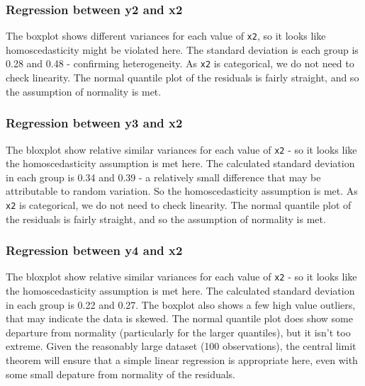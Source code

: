 \documentclass[
  letterpaper,
  DIV=11,
  numbers=noendperiod]{scrreprt}
\begin{document}
\subsubsection{Regression between y2 and
x2}\label{regression-between-y2-and-x2}

The boxplot shows different variances for each value of \texttt{x2}, so
it looks like homoscedasticity might be violated here. The standard
deviation is each group is 0.28 and 0.48 - confirming heterogeneity. As
\texttt{x2} is categorical, we do not need to check linearity. The
normal quantile plot of the residuals is fairly straight, and so the
assumption of normality is met.

\subsubsection{Regression between y3 and
x2}\label{regression-between-y3-and-x2}

The bloxplot show relative similar variances for each value of
\texttt{x2} - so it looks like the homoscedasticity assumption is met
here. The calculated standard deviation in each group is 0.34 and 0.39 -
a relatively small difference that may be attributable to random
variation. So the homoscedasticity assumption is met. As \texttt{x2} is
categorical, we do not need to check linearity. The normal quantile plot
of the residuals is fairly straight, and so the assumption of normality
is met.

\subsubsection{Regression between y4 and
x2}\label{regression-between-y4-and-x2}

The bloxplot show relative similar variances for each value of
\texttt{x2} - so it looks like the homoscedasticity assumption is met
here. The calculated standard deviation in each group is 0.22 and 0.27.
The boxplot also shows a few high value outliers, that may indicate the
data is skewed. The normal quantile plot does show some departure from
normality (particularly for the larger quantiles), but it isn't too
extreme. Given the reasonably large dataset (100 observations), the
central limit theorem will ensure that a simple linear regression is
appropriate here, even with some small depature from normality of the
residuals.
\end{document}
